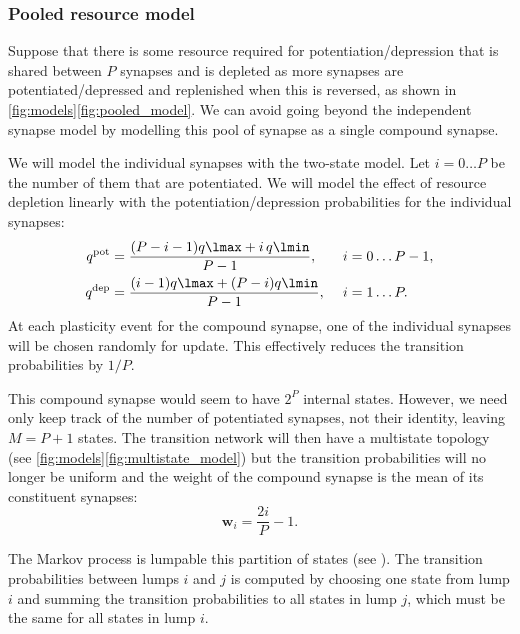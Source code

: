 \documentclass[10pt]{article}
\newcommand{\w}{\mathbf{w}}
\newcommand{\pot}{^{\text{pot}}}
\newcommand{\dep}{^{\text{dep}}}
\begin{document}
\subsubsection{Pooled resource model}\label{sec:pooledmodel}

Suppose that there is some resource required for potentiation/depression that is shared between $P$ synapses and is depleted as more synapses are potentiated/depressed and replenished when this is reversed, as shown in \autoref{fig:models}\ref{fig:pooled_model}.
We can avoid going beyond the independent synapse model by modelling this pool of synapse as a single compound synapse.

We will model the individual synapses with the two-state model.
Let $i=0\ldots P$ be the number of them that are potentiated.
We will model the effect of resource depletion linearly with the potentiation/depression probabilities for the individual synapses:
%
\begin{equation}\label{eq:depletion}
  \begin{aligned}
    q\pot &= \frac{(P-i-1)q\lmax + i\,q\lmin}{P-1}, \quad& i &= 0 \ldots P-1,\\
    q\dep &= \frac{(i-1)q\lmax + (P-i)q\lmin}{P-1}, & i &= 1 \ldots P.
  \end{aligned}
\end{equation}
%
At each plasticity event for the compound synapse, one of the individual synapses will be chosen randomly for update.
This effectively reduces the transition probabilities by $1/P$.

This compound synapse would seem to have $2^P$ internal states.
However, we need only keep track of the number of potentiated synapses, not their identity, leaving $M=P+1$ states.
The transition network will then have a multistate topology (see \autoref{fig:models}\ref{fig:multistate_model}) but the transition probabilities will no longer be uniform and the weight of the compound synapse is the mean of its constituent synapses:
%
\begin{equation}\label{eq:pooledweight}
  \w_i = \frac{2i}{P}-1.
\end{equation}
%


The Markov process is lumpable \wrt this partition of states (see \cite{kemeny1960finite,burke1958markovian,Ball1993Lumpability}).
The transition probabilities between lumps $i$ and $j$ is computed by choosing one state from lump $i$ and summing the transition probabilities to all states in lump $j$,
which must be the same for all states in lump $i$.
\end{document}
